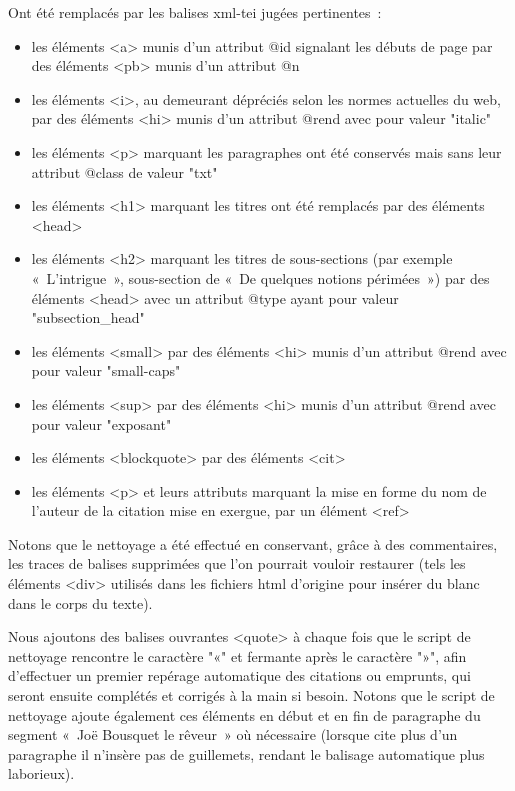 \documentclass[12pt, a4paper]{article}
\begin{document}
Ont été remplacés par les balises xml-tei jugées pertinentes~:
\begin{itemize}
    \item les éléments <a> munis d'un attribut @id signalant les débuts de page par des éléments <pb> munis d'un attribut @n
    \item les éléments <i>, au demeurant dépréciés selon les normes actuelles du web, par des éléments <hi> munis d'un attribut @rend avec pour valeur "italic"
    \item les éléments <p> marquant les paragraphes ont été conservés mais sans leur attribut @class de valeur "txt"
    \item les éléments <h1> marquant les titres ont été remplacés par des éléments <head>
    \item les éléments <h2> marquant les titres de sous-sections (par exemple «~L'intrigue~», sous-section de «~De quelques notions périmées~») par des éléments <head> avec un attribut @type ayant pour valeur "subsection\_head"
    \item les éléments <small> par des éléments <hi> munis d'un attribut @rend avec pour valeur "small-caps"
    \item les éléments <sup> par des éléments <hi> munis d'un attribut @rend avec pour valeur "exposant"
    \item les éléments <blockquote> par des éléments <cit>
    \item les éléments <p> et leurs attributs marquant la mise en forme du nom de l'auteur de la citation mise en exergue, par un élément <ref>
\end{itemize}

Notons que le nettoyage a été effectué en conservant, grâce à des commentaires, les traces de balises supprimées que l'on pourrait vouloir restaurer (tels les éléments <div> utilisés dans les fichiers html d'origine pour insérer du blanc dans le corps du texte).

Nous ajoutons des balises ouvrantes <quote> à chaque fois que le script de nettoyage rencontre le caractère "«" et fermante après le caractère "»", afin d'effectuer un premier repérage automatique des citations ou emprunts, qui seront ensuite complétés et corrigés à la main si besoin. Notons que le script de nettoyage ajoute également ces éléments en début et en fin de paragraphe du segment «~Joë Bousquet le rêveur~» où nécessaire (lorsque \robbe{} cite plus d'un paragraphe il n'insère pas de guillemets, rendant le balisage automatique plus laborieux).
\end{document}
